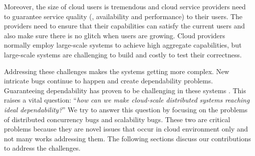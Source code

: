 Moreover, the size of cloud users is tremendous and cloud service providers need
to guarantee service quality (\ie, availability and performance) to their users.
The providers need to ensure that their capabilities can satisfy the current
users and also make sure there is no glitch when users are growing. Cloud
providers normally employ large-scale systems to achieve high aggregate
capabilities, but large-scale systems are challenging to build and costly to
test their correctness.

Addressing these challenges makes the systems getting more complex. New
intricate bugs continue to happen and create dependability problems.
Guaranteeing dependability has proven to be challenging in these systems
\cite{Gunawi+11-FateDestini, Guo+11-Demeter, Wang+14-Exalt, Yang+09-Modist}.
This raises a vital question: ``{\em how can we make cloud-scale distributed
systems reaching ideal dependability?}'' We try to answer this question by
focusing on the problems of distributed concurrency bugs and scalability bugs.
These two are critical problems because they are novel issues that occur in
cloud environment only and not many works addressing them.  The following
sections discuss our contributions to address the challenges.

